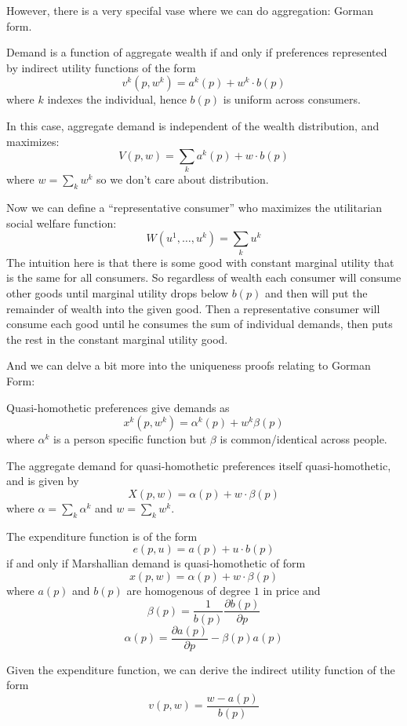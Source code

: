 However, there is a very specifal vase where we can do aggregation:
Gorman form. 


\begin{prop}
  Demand is a function of aggregate wealth if and only if preferences
  represented by indirect utility functions of the form
  \[
  v^k(p, w^k) = a^k(p) + w^k \cdot b(p)
  \]
  where $k$ indexes the individual, hence $b(p)$ is uniform across
  consumers.
\end{prop}


In this case, aggregate demand is independent of the wealth
distribution, and maximizes:
\[
V(p,w) = \sum_k a^k(p) + w \cdot b(p)
\]
where $w = \sum_k w^k$ so we don't care about distribution. 

Now we can define a ``representative consumer'' who maximizes the
utilitarian social welfare function:
\[
W(u^1, \dots, u^k) = \sum_k u^k
\]
The intuition here is that there is some good with constant marginal
utility that is the same for all consumers. So regardless of wealth
each consumer will consume other goods until marginal utility drops
below $b(p)$ and then will put the remainder of wealth into the given
good. Then a representative consumer will consume each good until he
consumes the sum of individual demands, then puts the rest in the
constant marginal utility good.

And we can delve a bit more into the uniqueness proofs relating to
Gorman Form:

\begin{definition}
  Quasi-homothetic preferences give demands as
  \[
  x^k(p, w^k) = \alpha^k(p) + w^k \beta(p)
  \]
  where $\alpha^k$ is a person specific function but $\beta$ is
  common/identical across people.

  The aggregate demand for quasi-homothetic preferences itself
  quasi-homothetic, and is given by
  \[
  X(p,w) = \alpha(p) + w \cdot \beta(p)
  \]
  where $\alpha = \sum_k \alpha^k$ and $w = \sum_k w^k$.
\end{definition}


\begin{theorem}
  The expenditure function is of the form
  \[
  e(p,u) = a(p) + u \cdot b(p)
  \]
  if and only if Marshallian demand is quasi-homothetic of form
  \[
  x(p,w) = \alpha(p) + w \cdot \beta(p)
  \]
  where $a(p)$ and $b(p)$ are homogenous of degree $1$ in price and
  \[
  \beta(p) = \frac{1}{b(p)}\frac{\partial b(p)}{\partial p}
  \]
  \[
  \alpha(p) = \frac{\partial a(p)}{\partial p} - \beta(p)a(p)
  \]

  Given the expenditure function, we can derive the indirect utility
  function of the form
  \[
  v(p,w) = \frac{w - a(p)}{b(p)}
  \]
\end{theorem}
